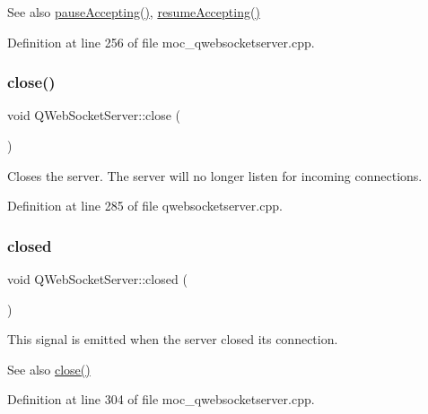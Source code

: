\begin{DoxySeeAlso}{See also}
\mbox{\hyperlink{class_q_web_socket_server_abebb5c4066427590c3d4aacecfe51567}{pause\+Accepting()}}, \mbox{\hyperlink{class_q_web_socket_server_abd60e2bf5ca8e58e15ff3ac061af85ba}{resume\+Accepting()}} 
\end{DoxySeeAlso}


Definition at line 256 of file moc\+\_\+qwebsocketserver.\+cpp.

\mbox{\label{class_q_web_socket_server_aa4b5f9244c27cdd1b0c8ee830ac0c1e1}} 
\subsubsection{\texorpdfstring{close()}{close()}}
{\footnotesize\ttfamily void Q\+Web\+Socket\+Server\+::close (\begin{DoxyParamCaption}{ }\end{DoxyParamCaption})}

Closes the server. The server will no longer listen for incoming connections. 

Definition at line 285 of file qwebsocketserver.\+cpp.

\mbox{\label{class_q_web_socket_server_abb62d368b25890b8fab13d8272a6e47c}} 
\subsubsection{\texorpdfstring{closed}{closed}}
{\footnotesize\ttfamily void Q\+Web\+Socket\+Server\+::closed (\begin{DoxyParamCaption}{ }\end{DoxyParamCaption})\hspace{0.3cm}{\ttfamily [signal]}}

This signal is emitted when the server closed its connection.

\begin{DoxySeeAlso}{See also}
\mbox{\hyperlink{class_q_web_socket_server_aa4b5f9244c27cdd1b0c8ee830ac0c1e1}{close()}} 
\end{DoxySeeAlso}


Definition at line 304 of file moc\+\_\+qwebsocketserver.\+cpp.

